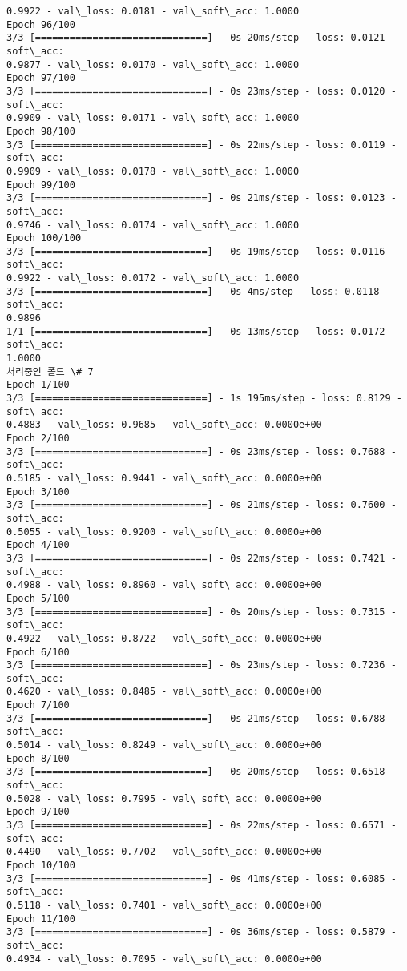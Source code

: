 \documentclass[11pt]{article}
\begin{document}
\begin{Verbatim}[commandchars=\\\{\}]
0.9922 - val\_loss: 0.0181 - val\_soft\_acc: 1.0000
Epoch 96/100
3/3 [==============================] - 0s 20ms/step - loss: 0.0121 - soft\_acc:
0.9877 - val\_loss: 0.0170 - val\_soft\_acc: 1.0000
Epoch 97/100
3/3 [==============================] - 0s 23ms/step - loss: 0.0120 - soft\_acc:
0.9909 - val\_loss: 0.0171 - val\_soft\_acc: 1.0000
Epoch 98/100
3/3 [==============================] - 0s 22ms/step - loss: 0.0119 - soft\_acc:
0.9909 - val\_loss: 0.0178 - val\_soft\_acc: 1.0000
Epoch 99/100
3/3 [==============================] - 0s 21ms/step - loss: 0.0123 - soft\_acc:
0.9746 - val\_loss: 0.0174 - val\_soft\_acc: 1.0000
Epoch 100/100
3/3 [==============================] - 0s 19ms/step - loss: 0.0116 - soft\_acc:
0.9922 - val\_loss: 0.0172 - val\_soft\_acc: 1.0000
3/3 [==============================] - 0s 4ms/step - loss: 0.0118 - soft\_acc:
0.9896
1/1 [==============================] - 0s 13ms/step - loss: 0.0172 - soft\_acc:
1.0000
처리중인 폴드 \# 7
Epoch 1/100
3/3 [==============================] - 1s 195ms/step - loss: 0.8129 - soft\_acc:
0.4883 - val\_loss: 0.9685 - val\_soft\_acc: 0.0000e+00
Epoch 2/100
3/3 [==============================] - 0s 23ms/step - loss: 0.7688 - soft\_acc:
0.5185 - val\_loss: 0.9441 - val\_soft\_acc: 0.0000e+00
Epoch 3/100
3/3 [==============================] - 0s 21ms/step - loss: 0.7600 - soft\_acc:
0.5055 - val\_loss: 0.9200 - val\_soft\_acc: 0.0000e+00
Epoch 4/100
3/3 [==============================] - 0s 22ms/step - loss: 0.7421 - soft\_acc:
0.4988 - val\_loss: 0.8960 - val\_soft\_acc: 0.0000e+00
Epoch 5/100
3/3 [==============================] - 0s 20ms/step - loss: 0.7315 - soft\_acc:
0.4922 - val\_loss: 0.8722 - val\_soft\_acc: 0.0000e+00
Epoch 6/100
3/3 [==============================] - 0s 23ms/step - loss: 0.7236 - soft\_acc:
0.4620 - val\_loss: 0.8485 - val\_soft\_acc: 0.0000e+00
Epoch 7/100
3/3 [==============================] - 0s 21ms/step - loss: 0.6788 - soft\_acc:
0.5014 - val\_loss: 0.8249 - val\_soft\_acc: 0.0000e+00
Epoch 8/100
3/3 [==============================] - 0s 20ms/step - loss: 0.6518 - soft\_acc:
0.5028 - val\_loss: 0.7995 - val\_soft\_acc: 0.0000e+00
Epoch 9/100
3/3 [==============================] - 0s 22ms/step - loss: 0.6571 - soft\_acc:
0.4490 - val\_loss: 0.7702 - val\_soft\_acc: 0.0000e+00
Epoch 10/100
3/3 [==============================] - 0s 41ms/step - loss: 0.6085 - soft\_acc:
0.5118 - val\_loss: 0.7401 - val\_soft\_acc: 0.0000e+00
Epoch 11/100
3/3 [==============================] - 0s 36ms/step - loss: 0.5879 - soft\_acc:
0.4934 - val\_loss: 0.7095 - val\_soft\_acc: 0.0000e+00

\end{Verbatim}
\end{document}
